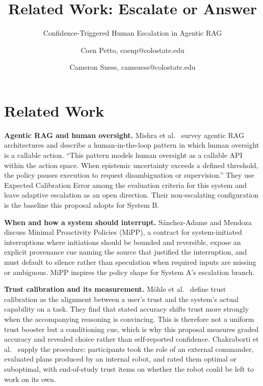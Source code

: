 \documentclass[sigconf,nonacm]{acmart}
\begin{document}
\title{Related Work: Escalate or Answer}
\subtitle{Confidence-Triggered Human Escalation in Agentic RAG}

\author{Coen Petto, coenp@colostate.edu}
\author{Cameron Suess, camsuess@colostate.edu}

\maketitle
\renewcommand{\shortauthors}{Petto and Suess}

\section{Related Work}
\label{sec:related}

\textbf{Agentic RAG and human oversight.} Mishra et al.~\cite{mishra2026}
survey agentic RAG architectures and describe a human-in-the-loop pattern
in which human oversight is a callable action. ``This pattern models human oversight
as a callable API within the action space. When epistemic uncertainty
exceeds a defined threshold, the policy pauses execution to request disambiguation or supervision.'' They use Expected Calibration Error among the evaluation
criteria for this system and leave adaptive escalation as an open
direction. Their non-escalating configuration is the baseline this proposal
adopts for System B.

\textbf{When and how a system should interrupt.} S\'anchez-Adame and
Mendoza~\cite{sanchezadame2026} discuss Minimal Proactivity Policies
(MiPP), a contract for system-initiated interruptions where initiations should
be bounded and reversible, expose an explicit provenance cue naming
the source that justified the interruption, and must default to
silence rather than speculation when required inputs are missing or
ambiguous. MiPP inspires the policy shape for System A's escalation
branch.

\textbf{Trust calibration and its measurement.} M\"ohle
et al.~\cite{mohle2026} define trust calibration as the alignment between a
user's trust and the system's actual capability on a task. They find that stated accuracy shifts trust more strongly when the accompanying reasoning is convincing. This is therefore not a uniform trust booster but a conditioning cue, which is why this
proposal measures graded accuracy and revealed choice rather than
self-reported confidence. Chakraborti et al.~\cite{chakraborti2018} supply
the procedure: participants took the role of an external commander,
evaluated plans produced by an internal robot, and rated them optimal or
suboptimal, with end-of-study trust items on whether the robot could be
left to work on its own.
\end{document}
